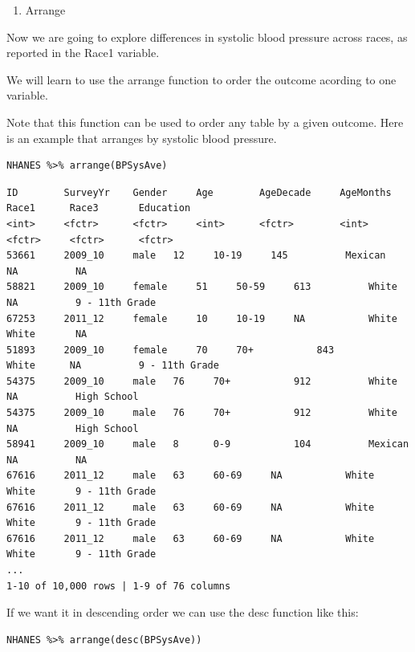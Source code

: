 \documentclass[
]{article}
\providecommand{\tightlist}{%
  \setlength{\itemsep}{0pt}\setlength{\parskip}{0pt}}
\begin{document}
\begin{enumerate}
\def\labelenumi{\arabic{enumi}.}
\setcounter{enumi}{7}
\tightlist
\item
  Arrange
\end{enumerate}

Now we are going to explore differences in systolic blood pressure
across races, as reported in the Race1 variable.

We will learn to use the arrange function to order the outcome acording
to one variable.

Note that this function can be used to order any table by a given
outcome. Here is an example that arranges by systolic blood pressure.

\begin{verbatim}
NHANES %>% arrange(BPSysAve)
\end{verbatim}

\begin{verbatim}
ID        SurveyYr    Gender     Age        AgeDecade     AgeMonths    Race1      Race3       Education
<int>     <fctr>      <fctr>     <int>      <fctr>        <int>        <fctr>     <fctr>      <fctr>
53661     2009_10     male   12     10-19     145          Mexican    NA          NA    
58821     2009_10     female     51     50-59     613          White      NA          9 - 11th Grade    
67253     2011_12     female     10     10-19     NA           White      White       NA    
51893     2009_10     female     70     70+           843          White      NA          9 - 11th Grade    
54375     2009_10     male   76     70+           912          White      NA          High School   
54375     2009_10     male   76     70+           912          White      NA          High School   
58941     2009_10     male   8      0-9           104          Mexican    NA          NA    
67616     2011_12     male   63     60-69     NA           White      White       9 - 11th Grade    
67616     2011_12     male   63     60-69     NA           White      White       9 - 11th Grade    
67616     2011_12     male   63     60-69     NA           White      White       9 - 11th Grade    
...
1-10 of 10,000 rows | 1-9 of 76 columns
\end{verbatim}

If we want it in descending order we can use the desc function like
this:

\begin{verbatim}
NHANES %>% arrange(desc(BPSysAve))
\end{verbatim}
\end{document}
